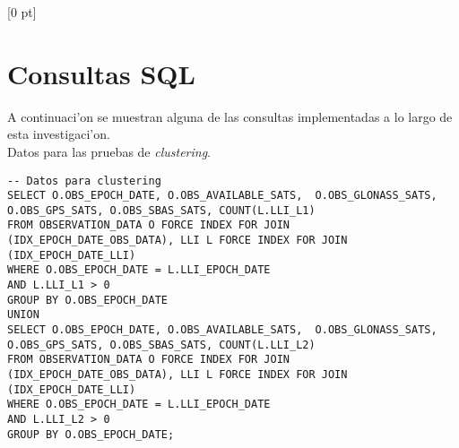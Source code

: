 \titlespacing{\chapter}{0 pt}{30 pt}{50 pt}[0 pt]
\titleformat{\section}{\Large\bfseries}{\thesection}{0 pt}{\hspace{30 pt}}
\titleformat{\subsection}{\large\bfseries}{\thesubsection}{0 pt}{\hspace{30 pt}}
\pagestyle{fancy}
\fancyhead[LO,LE]{\footnotesize\emph{\leftmark}}
\fancyhead[RO,RE]{\thepage}
\fancyfoot[CO,CE]{}

\chapter{Consultas SQL} %

\normalsize
A continuaci'on se muestran alguna de las consultas implementadas a lo largo de esta investigaci'on. \\

Datos para las pruebas de \emph{clustering}.\\

\begin{lstlisting}
-- Datos para clustering
SELECT O.OBS_EPOCH_DATE, O.OBS_AVAILABLE_SATS,  O.OBS_GLONASS_SATS, O.OBS_GPS_SATS, O.OBS_SBAS_SATS, COUNT(L.LLI_L1)
FROM OBSERVATION_DATA O FORCE INDEX FOR JOIN (IDX_EPOCH_DATE_OBS_DATA), LLI L FORCE INDEX FOR JOIN (IDX_EPOCH_DATE_LLI)
WHERE O.OBS_EPOCH_DATE = L.LLI_EPOCH_DATE
AND L.LLI_L1 > 0
GROUP BY O.OBS_EPOCH_DATE
UNION
SELECT O.OBS_EPOCH_DATE, O.OBS_AVAILABLE_SATS,  O.OBS_GLONASS_SATS, O.OBS_GPS_SATS, O.OBS_SBAS_SATS, COUNT(L.LLI_L2)
FROM OBSERVATION_DATA O FORCE INDEX FOR JOIN (IDX_EPOCH_DATE_OBS_DATA), LLI L FORCE INDEX FOR JOIN (IDX_EPOCH_DATE_LLI)
WHERE O.OBS_EPOCH_DATE = L.LLI_EPOCH_DATE
AND L.LLI_L2 > 0
GROUP BY O.OBS_EPOCH_DATE;
\end{lstlisting}

